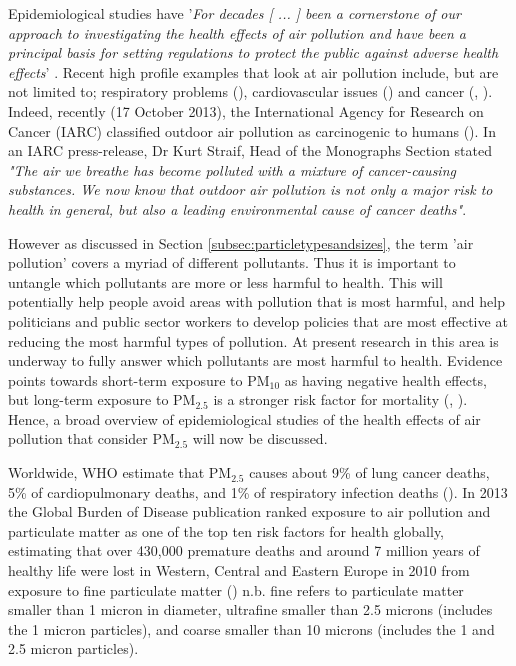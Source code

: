 Epidemiological studies have '\textit{For decades [ ... ] been a cornerstone of our approach to investigating the health effects of air pollution and have been a principal basis for setting regulations to protect the public against adverse health effects}' \cite{Zeger2000}. Recent high profile examples that look at air pollution include, but are not limited to; respiratory problems (\cite{Peacock2011}), cardiovascular issues (\cite{Brook2010}) and cancer (\cite{Iii2012}, \cite{loomis2013}). Indeed, recently (17 October 2013), the International Agency for Research on Cancer (IARC) classified outdoor air pollution as carcinogenic to humans (\cite{loomis2013}). In an IARC press-release, Dr Kurt Straif, Head of the Monographs Section stated \textit{"The air we breathe has become polluted with a mixture of cancer-causing substances. We now know that outdoor air pollution is not only a major risk to health in general, but also a leading environmental cause of cancer deaths"}.


However as discussed in Section \ref{subsec:particletypesandsizes}, the term 'air pollution' covers a myriad of different pollutants. Thus it is important to untangle which pollutants are more or less harmful to health. This will potentially help people avoid areas with pollution that is most harmful, and help politicians and public sector workers to develop policies that are most effective at reducing the most harmful types of pollution. At present research in this area is underway to fully answer which pollutants are most harmful to health. Evidence points towards short-term exposure to PM$_{10}$ as having negative health effects, but long-term exposure to PM$_{2.5}$ is a stronger risk factor for mortality (\cite{WorldHealthOrganization2013a}, \cite{Dockery1993}). Hence, a broad overview of epidemiological studies of the health effects of air pollution that consider PM$_{2.5}$ will now be discussed.

Worldwide, WHO estimate that PM$_{2.5}$ causes about 9\% of lung cancer deaths, 5\% of cardiopulmonary deaths, and 1\% of respiratory infection deaths (\cite{WorldHealthOrganization2012}). In 2013 the Global Burden of Disease publication ranked exposure to air pollution and particulate matter as one of the top ten risk factors for health globally, estimating that over 430,000 premature deaths and around 7 million years of healthy life were lost in Western, Central and Eastern Europe in 2010 from exposure to fine particulate matter (\cite{Brauer2012}) n.b. fine refers to particulate matter smaller than 1 micron in diameter, ultrafine smaller than 2.5 microns (includes the 1 micron particles), and coarse smaller than 10 microns (includes the 1 and 2.5 micron particles). 

